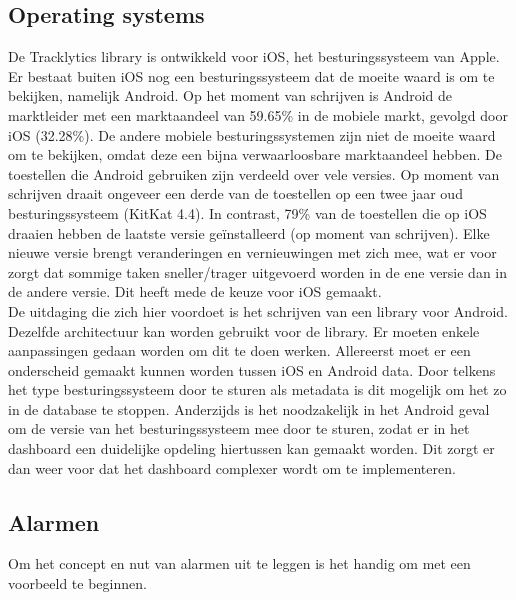 \subsection{Operating systems} %
De Tracklytics library is ontwikkeld voor iOS, het besturingssysteem van Apple. Er bestaat buiten iOS nog een besturingssysteem dat de moeite waard is om te bekijken, namelijk Android. Op het moment van schrijven is Android de marktleider met een marktaandeel van 59.65\% in de mobiele markt, gevolgd door iOS (32.28\%). De andere mobiele besturingssystemen zijn niet de moeite waard om te bekijken, omdat deze een bijna verwaarloosbare marktaandeel hebben. De toestellen die Android gebruiken zijn verdeeld over vele versies. Op moment van schrijven draait ongeveer een derde van de toestellen op een twee jaar oud besturingssysteem (KitKat 4.4). In contrast, 79\% van de toestellen die op iOS draaien hebben de laatste versie ge\"installeerd (op moment van schrijven). Elke nieuwe versie brengt veranderingen en vernieuwingen met zich mee, wat er voor zorgt dat sommige taken sneller/trager uitgevoerd worden in de ene versie dan in de andere versie. Dit heeft mede de keuze voor iOS gemaakt. \\

De uitdaging die zich hier voordoet is het schrijven van een library voor Android. Dezelfde architectuur kan worden gebruikt voor de library. Er moeten enkele aanpassingen gedaan worden om dit te doen werken. Allereerst moet er een onderscheid gemaakt kunnen worden tussen iOS en Android data. Door telkens het type besturingssysteem door te sturen als metadata is dit mogelijk om het zo in de database te stoppen. Anderzijds is het noodzakelijk in het Android geval om de versie van het besturingssysteem mee door te sturen, zodat er in het dashboard een duidelijke opdeling hiertussen kan gemaakt worden. Dit zorgt er dan weer voor dat het dashboard complexer wordt om te implementeren.






\subsection{Alarmen}
Om het concept en nut van alarmen uit te leggen is het handig om met een voorbeeld te beginnen. 

